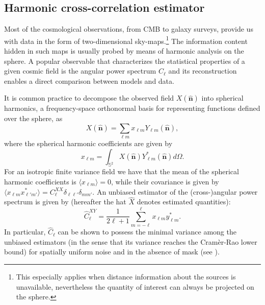 \documentclass[a4paper,11pt]{article}
\newcommand{\nver}{\hat{\mathbf{n}}}
\begin{document}
\subsection{Harmonic cross-correlation estimator}
\label{subsec:stdcorr}
Most of the cosmological observations, from CMB to galaxy surveys, provide us with data in the form 
of two-dimensional sky-maps.\footnote{This especially applies when distance information about the sources is unavailable, nevertheless the quantity of interest can always be projected on the sphere.} 
The information content hidden in such maps is usually probed by means of harmonic analysis on the sphere. A popular observable that characterizes the statistical properties of a given cosmic field is the
angular power spectrum $C_{\ell}$ and its reconstruction enables a direct comparison between
models and data.

It is common practice to decompose the observed field $X(\nver)$ into spherical harmonics, a frequency-space orthonormal basis for representing functions defined over the sphere, as
%
\begin{equation}
X(\nver) = \sum_{\ell m} x_{\ell m}Y_{\ell m}(\nver),
\label{eqn:spharm}
\end{equation}
%
where the spherical harmonic coefficients are given by
%
\begin{equation}
x_{\ell m} = \int_{\mathbb{S}^2}X(\nver)Y^*_{\ell m}(\nver)d\Omega.
\label{eqn:sphcoeff}
\end{equation}
%
For an isotropic finite variance field we have that the mean of the spherical harmonic coefficients is $\langle x_{\ell m}\rangle = 0$,
while their covariance is given by $\langle x_{\ell m} x^*_{\ell' m'}\rangle = C^{XX}_{\ell}\delta_{\ell\ell'}\delta_{mm'}$.
An unbiased estimator of the (cross-)angular power spectrum is given by (hereafter the hat $\hat{X}$ 
denotes  estimated quantities):
%
\begin{equation}
\hat{C}_{\ell}^{XY} = \frac{1}{2\ell+1}\sum_{m=-\ell}^{\ell} x_{\ell m}y_{\ell m}^*.
\label{eqn:sphest}
\end{equation}
%
In particular, $\hat{C}_{\ell}$ can be shown to possess the minimal variance among the unbiased 
estimators (in the sense that its variance reaches the Cram\`er-Rao lower bound) for spatially uniform noise and in the absence of mask (see \cite{Tegmark1997}).
\end{document}
